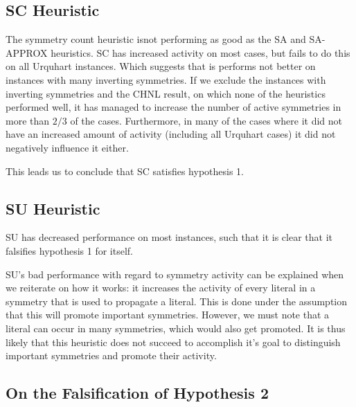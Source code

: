 \subsection{SC Heuristic}
	The symmetry count heuristic isnot performing as good as the SA and SA-APPROX heuristics.
	SC has increased activity on most cases, but fails to do this on all Urquhart instances.
	Which suggests that is performs not better on instances with many inverting symmetries.
	If we exclude the instances with inverting symmetries and the CHNL result, on which none of the
	heuristics performed well, it has managed to increase the number of active symmetries in more
	than $2/3$ of the cases.
	Furthermore, in many of the cases where it did not have an increased amount of activity
	(including all Urquhart cases) it did not negatively influence it either.

	This leads us to conclude that SC satisfies hypothesis 1.

\subsection{SU Heuristic}
	SU has decreased performance on most instances, such that it is clear that it falsifies
	hypothesis 1 for itself.

	SU's bad performance with regard to symmetry activity can be explained when we reiterate on
	how it works: it increases the activity of every literal in a symmetry that is used to propagate
	a literal.
	This is done under the assumption that this will promote important symmetries.
	However, we must note that a literal can occur in many symmetries, which would also get
	promoted.
	It is thus likely that this heuristic does not succeed to accomplish it's goal to distinguish
	important symmetries and promote their activity.

\subsection{On the Falsification of Hypothesis 2}
\label{ssec:falsification_hyp_2}
